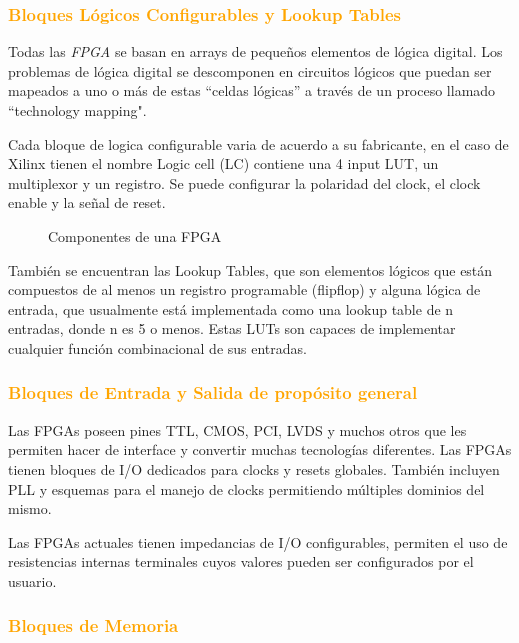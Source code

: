 \documentclass[a4paper,11pt]{article}
\begin{document}
		\subsubsection{\textcolor{orange}{Bloques Lógicos Configurables y Lookup Tables}}
Todas las \textit{FPGA} se basan en arrays de pequeños elementos de lógica digital. Los problemas de lógica digital se descomponen en circuitos lógicos que puedan ser mapeados a uno o más de estas “celdas lógicas” a través de un proceso llamado “technology mapping".

Cada bloque de logica configurable varia de acuerdo a su fabricante, en el caso de Xilinx tienen el nombre Logic cell (LC) contiene una 4 input LUT, un multiplexor y un registro. Se puede configurar la polaridad del clock, el clock enable y la señal de reset.


\begin{figure}[h!]
 \begin{center}
  \caption{Componentes de una FPGA}
  \label{fig:esquema}
 \end{center}
\end{figure}

También se encuentran las Lookup Tables, que son elementos lógicos que están compuestos de al menos un registro programable (flip\-flop) y alguna lógica de entrada, que usualmente está implementada como una lookup table de n entradas, donde n es 5 o menos. Estas LUTs son capaces de implementar cualquier función combinacional de sus entradas.

		\subsubsection{\textcolor{orange}{Bloques de Entrada y Salida de propósito general }}

Las FPGAs poseen pines TTL, CMOS, PCI, LVDS y muchos otros que les permiten hacer de interface y convertir muchas tecnologías diferentes. Las FPGAs tienen bloques de I/O dedicados para clocks y resets globales. También incluyen PLL y esquemas para el manejo de clocks permitiendo múltiples dominios del mismo.

Las FPGAs actuales tienen impedancias de I/O configurables,  permiten el uso de resistencias internas terminales cuyos valores pueden ser configurados por el usuario. 


		\subsubsection{\textcolor{orange}{Bloques de Memoria}}
\end{document}
